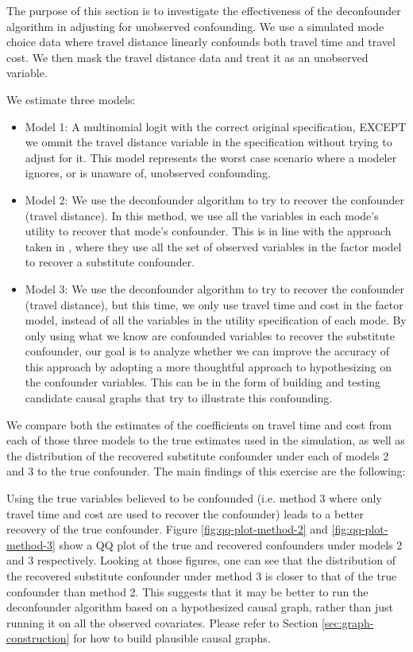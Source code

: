 The purpose of this section is to investigate the effectiveness of the 
deconfounder algorithm \citep{wang_2019_blessings} in adjusting for unobserved 
confounding. We use a simulated mode choice data where travel distance 
linearly confounds both travel time and travel cost. We then mask the travel 
distance data and treat it as an unobserved variable. 


We estimate three models:

\begin{itemize}
	\item Model 1: A multinomial logit with the correct original specification, 
	EXCEPT we ommit the travel distance variable in the specification without 
	trying to adjust for it. This model represents the worst case scenario 
	where a modeler ignores, or is unaware of, unobserved confounding.
	\item Model 2: We use the deconfounder algorithm to try to recover the 
	confounder (travel distance). In this method, we use all the variables in 
	each mode's utility to recover that mode's confounder. This is in line 
	with the approach taken in \citet{wang_2019_blessings}, where they use all the set 
	of observed variables in the factor model to recover a substitute 
	confounder.
	\item Model 3: We use the deconfounder algorithm to try to recover the 
	confounder (travel distance), but this time, we only use travel time and 
	cost in the factor model, instead of all the variables in the utility 
	specification of each mode. By only using what we know are confounded 
	variables to recover the substitute confounder, our goal is to analyze 
	whether we can improve the accuracy of this approach by adopting a more 
	thoughtful approach to hypothesizing on the confounder variables. This can 
	be in the form of building and testing candidate causal graphs that 
	try to illustrate this confounding. 
\end{itemize}


We compare both the estimates of the coefficients on travel time and cost from 
each of those three models to the true estimates used in the simulation, as well as the distribution of the recovered substitute confounder under each of 
models 2 and 3 to the true confounder. The main findings of this exercise are the following:


Using the true variables believed to be confounded (i.e. method 3 where only 
travel time and cost are used to recover the confounder) leads to a better 
recovery of the true confounder. Figure \ref{fig:qq-plot-method-2} and \ref{fig:qq-plot-method-3} show a QQ plot of the true 
and recovered confounders under models 2 and 3 respectively. Looking at those 
figures, one can see that the distribution of the recovered substitute 
confounder under method 3 is closer to that of the true confounder than method 
2. This suggests that it may be better to run the deconfounder algorithm based 
on a hypothesized causal graph, rather than just running it on all the 
observed covariates. Please refer to Section \ref{sec:graph-construction} for how to build plausible causal graphs. 


